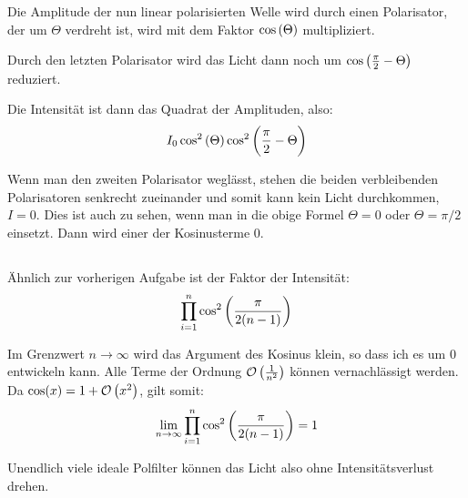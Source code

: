 Die Amplitude der nun linear polarisierten Welle wird durch einen Polarisator,
der um $\Theta$ verdreht ist, wird mit dem Faktor $\cos\del\Theta$
multipliziert.

Durch den letzten Polarisator wird das Licht dann noch um $\cos\del{\frac \pi 2
- \Theta}$ reduziert.

Die Intensität ist dann das Quadrat der Amplituden, also:
\[
	I_0 \cos^2\del\Theta \cos^2\del{\frac \pi 2 - \Theta}
\]

Wenn man den zweiten Polarisator weglässt, stehen die beiden verbleibenden
Polarisatoren senkrecht zueinander und somit kann kein Licht durchkommen, $I =
0$. Dies ist auch zu sehen, wenn man in die obige Formel $\Theta = 0$ oder
$\Theta = \pi/2$ einsetzt. Dann wird einer der Kosinusterme $0$.

\subsection{}

Ähnlich zur vorherigen Aufgabe ist der Faktor der Intensität:
\[
	\prod_{i = 1}^{n} \cos^2\del{\frac{\pi}{2(n-1)}}
\]

Im Grenzwert $n \to \infty$ wird das Argument des Kosinus klein, so dass ich es
um $0$ entwickeln kann. Alle Terme der Ordnung $\mathcal O\del{\frac{1}{n^2}}$
können vernachlässigt werden. Da $\cos(x) = 1 + \mathcal O\del{x^2}$, gilt
somit:
\[
	\lim_{n \to \infty} \prod_{i = 1}^{n} \cos^2\del{\frac{\pi}{2(n-1)}} = 1
\]

Unendlich viele ideale Polfilter können das Licht also ohne Intensitätsverlust
drehen.






